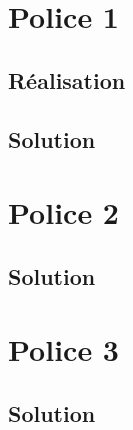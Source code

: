 \documentclass[a4paper, 12pt]{article}
\begin{document}
\section{Police 1}	
\subsection{Réalisation}
\subsection{Solution}

\section{Police 2}	
\subsection{Solution}

\section{Police 3}			
\subsection{Solution}
	
\end{document}
